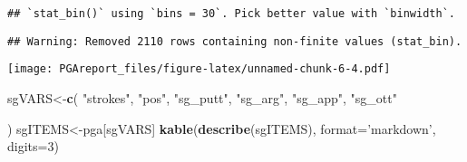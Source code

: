 \documentclass[
]{article}
\newenvironment{Shaded}{\begin{snugshade}}{\end{snugshade}}
\newcommand{\DataTypeTok}[1]{\textcolor[rgb]{0.13,0.29,0.53}{#1}}
\newcommand{\DecValTok}[1]{\textcolor[rgb]{0.00,0.00,0.81}{#1}}
\newcommand{\KeywordTok}[1]{\textcolor[rgb]{0.13,0.29,0.53}{\textbf{#1}}}
\newcommand{\NormalTok}[1]{#1}
\newcommand{\StringTok}[1]{\textcolor[rgb]{0.31,0.60,0.02}{#1}}
\begin{document}
\begin{verbatim}
## `stat_bin()` using `bins = 30`. Pick better value with `binwidth`.
\end{verbatim}

\begin{verbatim}
## Warning: Removed 2110 rows containing non-finite values (stat_bin).
\end{verbatim}

\texttt{[image: PGAreport\_files/figure-latex/unnamed-chunk-6-4.pdf]}

\begin{Shaded}
\begin{Highlighting}[]
\NormalTok{sgVARS<-}\KeywordTok{c}\NormalTok{(}
           \StringTok{"strokes"}\NormalTok{,}
           \StringTok{"pos"}\NormalTok{,}
           \StringTok{"sg_putt"}\NormalTok{,}
           \StringTok{"sg_arg"}\NormalTok{,}
           \StringTok{"sg_app"}\NormalTok{,}
           \StringTok{"sg_ott"}

\NormalTok{)}
\NormalTok{sgITEMS<-pga[sgVARS]}
\KeywordTok{kable}\NormalTok{(}\KeywordTok{describe}\NormalTok{(sgITEMS), }\DataTypeTok{format=}\StringTok{'markdown'}\NormalTok{, }
      \DataTypeTok{digits=}\DecValTok{3}\NormalTok{) }
\end{Highlighting}
\end{Shaded}
\end{document}
